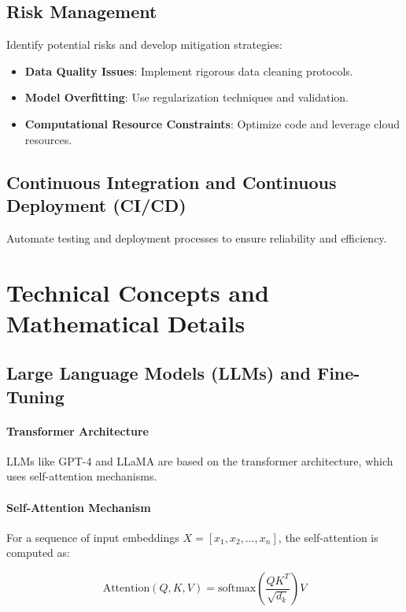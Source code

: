 \documentclass[12pt, a4paper]{article}
\begin{document}
\subsection{Risk Management}

Identify potential risks and develop mitigation strategies:

\begin{itemize}
    \item \textbf{Data Quality Issues}: Implement rigorous data cleaning protocols.
    \item \textbf{Model Overfitting}: Use regularization techniques and validation.
    \item \textbf{Computational Resource Constraints}: Optimize code and leverage cloud resources.
\end{itemize}

\subsection{Continuous Integration and Continuous Deployment (CI/CD)}

Automate testing and deployment processes to ensure reliability and efficiency.

\section{Technical Concepts and Mathematical Details}

\subsection{Large Language Models (LLMs) and Fine-Tuning}

\paragraph{Transformer Architecture}

LLMs like GPT-4 and LLaMA are based on the transformer architecture, which uses self-attention mechanisms.

\paragraph{Self-Attention Mechanism}

For a sequence of input embeddings \( X = [x_1, x_2, \dots, x_n] \), the self-attention is computed as:

\begin{equation}
\text{Attention}(Q, K, V) = \text{softmax}\left( \frac{QK^T}{\sqrt{d_k}} \right)V
\end{equation}
\end{document}
